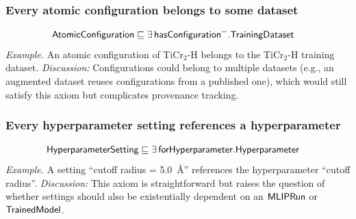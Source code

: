 \subsubsection{Every atomic configuration belongs to some dataset}
\begin{align*}
  \mathsf{AtomicConfiguration} &\sqsubseteq \exists\, \mathsf{hasConfiguration^{-}}.\mathsf{TrainingDataset}
\end{align*}
\emph{Example.} An atomic configuration of TiCr$_2$-H belongs to the TiCr$_2$-H
training dataset. \emph{Discussion:} Configurations could belong to
multiple datasets (e.g., an augmented dataset reuses configurations from a
published one), which would still satisfy this axiom but complicates
provenance tracking.

\subsubsection{Every hyperparameter setting references a hyperparameter}
\begin{align*}
  \mathsf{HyperparameterSetting} &\sqsubseteq \exists\, \mathsf{forHyperparameter}.\mathsf{Hyperparameter}
\end{align*}
\emph{Example.} A setting ``cutoff radius = 5.0~\AA{}'' references the
hyperparameter ``cutoff radius''. \emph{Discussion:} This axiom is
straightforward but raises the question of whether settings should also be
existentially dependent on an $\mathsf{MLIPRun}$ or $\mathsf{TrainedModel}$.
